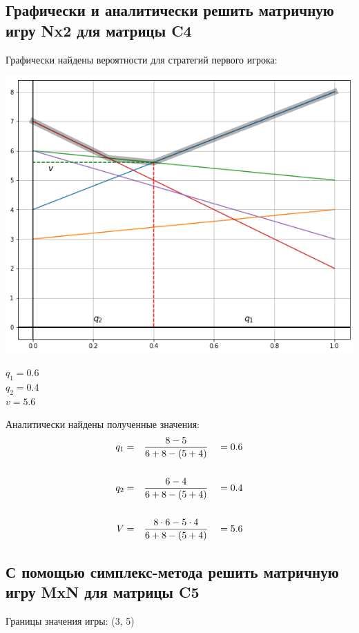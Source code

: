 \documentclass[12pt,a4paper]{article}%
\begin{document}
\subsection{Графически и аналитически решить матричную игру Nx2 для матрицы C4}
Графически найдены вероятности для стратегий первого игрока:
\begin{center}
  \includegraphics[scale=0.5]{C4.png}
\end{center}
$q_1 = 0.6$\\$q_2 = 0.4$\\$v = 5.6$

Аналитически найдены полученные значения:
$$
\begin{aligned}
  q_1 &= && \frac{8 - 5}                {6 + 8 - (5 + 4)} && = 0.6 \\ \vspace{0.5cm}\\
  q_2 &= && \frac{6 - 4}                {6 + 8 - (5 + 4)} && = 0.4 \\ \vspace{0.5cm}\\
  V   &= && \frac{8 \cdot 6 - 5 \cdot 4}{6 + 8 - (5 + 4)} && = 5.6
\end{aligned}
$$

\subsection{С помощью симплекс-метода решить матричную игру MxN для матрицы C5}
Границы значения игры: (3, 5)
\end{document}
